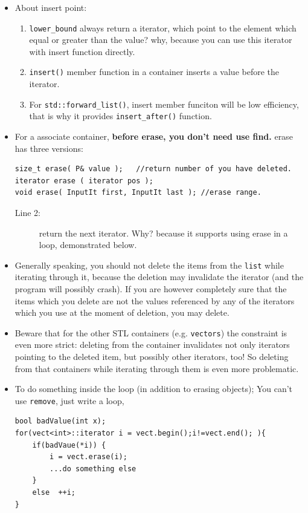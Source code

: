 \documentclass[a4paper,11pt,twoside]{book}
\begin{document}
\begin{itemize}
\item About insert point:
\begin{enumerate}
	\item \texttt{lower\_bound} always return a iterator, which point to the element which equal or greater than the value? why, because you can use this iterator with insert function directly.
	
	\item \texttt{insert()} member function in a container inserts a value before the iterator. 
	
	\item For \texttt{std::forward\_list()}, insert member funciton will be low efficiency, that is why it provides \texttt{insert\_after()} function.
\end{enumerate}


\item For a associate container, \textbf{before erase, you don't need use find.} erase has three versions:
\begin{lstlisting}[numbers=none]
size_t erase( P& value );   //return number of you have deleted.
iterator erase ( iterator pos );
void erase( InputIt first, InputIt last ); //erase range.
\end{lstlisting}
\begin{description}
	\item[Line 2:] return the next iterator. Why? because it supports using erase in a loop, demonstrated below.
\end{description}

	\item Generally speaking, you should not delete the items from the \texttt{list} while iterating through it, because the deletion may invalidate the iterator (and the program will possibly crash). If you are however completely sure that the items which you delete are not the values referenced by any of the iterators which you use at the moment of deletion, you may delete.

	\item Beware that for the other STL containers (e.g. \texttt{vectors}) the constraint is even more strict: deleting from the container invalidates not only iterators pointing to the deleted item, but possibly other iterators, too! So deleting from that containers while iterating through them is even more problematic.

	\item To do something inside the loop (in addition to erasing objects);  You can't use \texttt{remove}, just write a loop,
\begin{lstlisting}[numbers=none]
bool badValue(int x);
for(vect<int>::iterator i = vect.begin();i!=vect.end(); ){
	if(badVaue(*i)) {
		i = vect.erase(i);
		...do something else
	}
	else  ++i;
}	
\end{lstlisting}


\end{itemize}
\end{document}
